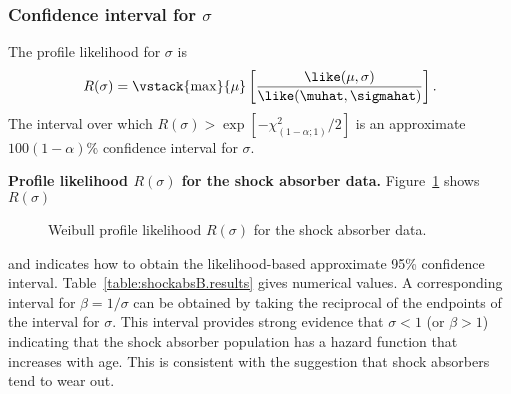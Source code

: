 \subsubsection{Confidence interval for $\sigma$}
The profile likelihood for $\sigma$ is
\begin{displaymath}
R(\sigma) = \vstack{\max}{\mu}
\left[\frac{\like(\mu,\sigma)}
{\like(\muhat, \sigmahat)}\right].
\end{displaymath}
The interval over which $R(\sigma) >
\exp[-\chi^{2}_{(1-\alpha;1)}/2]$ is an approximate
$100(1-\alpha) \%$ confidence interval for $\sigma$.
\begin{example}
{\bf Profile likelihood $R(\sigma)$ for the shock absorber data.}
Figure~\ref{figure:shockabsB.weib.sigmaprofile.ps} shows $R(\sigma)$
\begin{figure}
\caption{Weibull profile likelihood $R(\sigma)$
for the shock absorber data.}
\label{figure:shockabsB.weib.sigmaprofile.ps}
\end{figure}
and indicates how to obtain the likelihood-based approximate 95\%
confidence interval.  Table~\ref{table:shockabsB.results} gives
numerical values.  A corresponding interval for $\beta=1/\sigma$ can
be obtained by taking the reciprocal of the endpoints of the interval
for $\sigma$. This interval provides strong evidence that $\sigma < 1$
(or $\beta > 1$) indicating that the shock absorber population has a
hazard function that increases with age. This is consistent with the
suggestion that shock absorbers tend to wear out.
\end{example}

